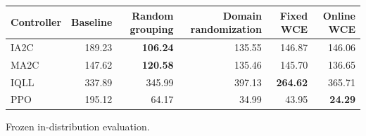 \begin{tabular}{lrrrrr}
\hline
Controller & Baseline & Random grouping & Domain randomization & Fixed WCE & Online WCE \\
\hline
IA2C & 189.23 & \textbf{106.24} & 135.55 & 146.87 & 146.06 \\
MA2C & 147.62 & \textbf{120.58} & 135.46 & 145.70 & 136.65 \\
IQLL & 337.89 & 345.99 & 397.13 & \textbf{264.62} & 365.71 \\
PPO & 195.12 & 64.17 & 34.99 & 43.95 & \textbf{24.29} \\
\hline
\end{tabular}
Frozen in-distribution evaluation.

